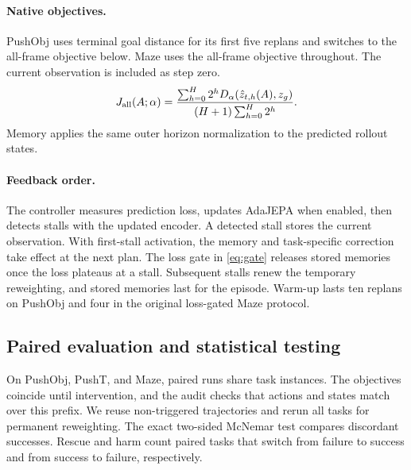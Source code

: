 \paragraph{Native objectives.}
PushObj uses terminal goal distance for its first five replans and switches to the all-frame objective below. Maze uses the all-frame objective throughout. The current observation is included as step zero.
\begin{equation}
J_{\rm all}(A;\alpha)=
\frac{\sum_{h=0}^{H}2^h D_\alpha(\hat z_{t,h}(A),z_g)}
     {(H+1)\sum_{h=0}^{H}2^h}.
\label{eq:baseexact}
\end{equation}
Memory applies the same outer horizon normalization to the predicted rollout states.

\paragraph{Feedback order.}
The controller measures prediction loss, updates AdaJEPA when enabled, then detects stalls with the updated encoder. A detected stall stores the current observation. With first-stall activation, the memory and task-specific correction take effect at the next plan. The loss gate in \cref{eq:gate} releases stored memories once the loss plateaus at a stall. Subsequent stalls renew the temporary reweighting, and stored memories last for the episode. Warm-up lasts ten replans on PushObj and four in the original loss-gated Maze protocol.

\subsection{Paired evaluation and statistical testing}
\label{sec:paired}
On PushObj, PushT, and Maze, paired runs share task instances. The objectives coincide until intervention, and the audit checks that actions and states match over this prefix. We reuse non-triggered trajectories and rerun all tasks for permanent reweighting. The exact two-sided McNemar test compares discordant successes. Rescue and harm count paired tasks that switch from failure to success and from success to failure, respectively.



